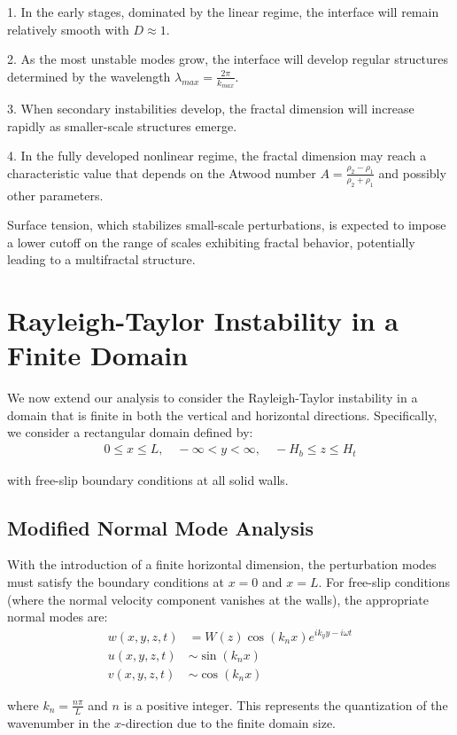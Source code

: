 \documentclass[12pt,a4paper]{article}
\begin{document}
1. In the early stages, dominated by the linear regime, the interface will remain relatively smooth with $D \approx 1$.

2. As the most unstable modes grow, the interface will develop regular structures determined by the wavelength $\lambda_{max} = \frac{2\pi}{k_{max}}$.

3. When secondary instabilities develop, the fractal dimension will increase rapidly as smaller-scale structures emerge.

4. In the fully developed nonlinear regime, the fractal dimension may reach a characteristic value that depends on the Atwood number $A = \frac{\rho_2 - \rho_1}{\rho_2 + \rho_1}$ and possibly other parameters.

Surface tension, which stabilizes small-scale perturbations, is expected to impose a lower cutoff on the range of scales exhibiting fractal behavior, potentially leading to a multifractal structure.

\section{Rayleigh-Taylor Instability in a Finite Domain}
We now extend our analysis to consider the Rayleigh-Taylor instability in a domain that is finite in both the vertical and horizontal directions. Specifically, we consider a rectangular domain defined by:
\begin{align}
0 \leq x \leq L, \quad -\infty < y < \infty, \quad -H_b \leq z \leq H_t
\end{align}

with free-slip boundary conditions at all solid walls.

\subsection{Modified Normal Mode Analysis}
With the introduction of a finite horizontal dimension, the perturbation modes must satisfy the boundary conditions at $x = 0$ and $x = L$. For free-slip conditions (where the normal velocity component vanishes at the walls), the appropriate normal modes are:
\begin{align}
w(x,y,z,t) &= W(z)\cos(k_n x)e^{ik_y y - i\omega t} \\
u(x,y,z,t) &\sim \sin(k_n x) \\
v(x,y,z,t) &\sim \cos(k_n x)
\end{align}

where $k_n = \frac{n\pi}{L}$ and $n$ is a positive integer. This represents the quantization of the wavenumber in the $x$-direction due to the finite domain size.
\end{document}
